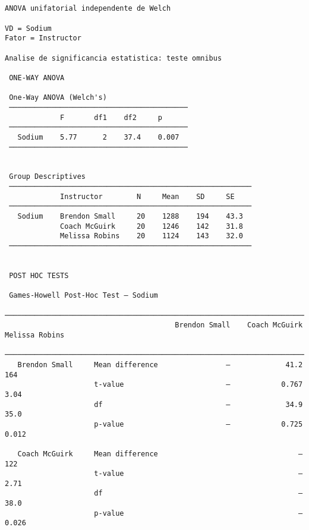 \documentclass[]{article}
\begin{document}
\begin{verbatim}


ANOVA unifatorial independente de Welch

VD = Sodium 
Fator = Instructor 

Analise de significancia estatistica: teste omnibus

 ONE-WAY ANOVA

 One-Way ANOVA (Welch's)                    
 ────────────────────────────────────────── 
             F       df1    df2     p       
 ────────────────────────────────────────── 
   Sodium    5.77      2    37.4    0.007   
 ────────────────────────────────────────── 


 Group Descriptives                                        
 ───────────────────────────────────────────────────────── 
             Instructor        N     Mean    SD     SE     
 ───────────────────────────────────────────────────────── 
   Sodium    Brendon Small     20    1288    194    43.3   
             Coach McGuirk     20    1246    142    31.8   
             Melissa Robins    20    1124    143    32.0   
 ───────────────────────────────────────────────────────── 


 POST HOC TESTS

 Games-Howell Post-Hoc Test – Sodium                                                       
 ───────────────────────────────────────────────────────────────────────────────────────── 
                                        Brendon Small    Coach McGuirk    Melissa Robins   
 ───────────────────────────────────────────────────────────────────────────────────────── 
   Brendon Small     Mean difference                —             41.2               164   
                     t-value                        —            0.767              3.04   
                     df                             —             34.9              35.0   
                     p-value                        —            0.725             0.012   
                                                                                           
   Coach McGuirk     Mean difference                                 —               122   
                     t-value                                         —              2.71   
                     df                                              —              38.0   
                     p-value                                         —             0.026   
                                                                                           

\end{verbatim}
\end{document}
